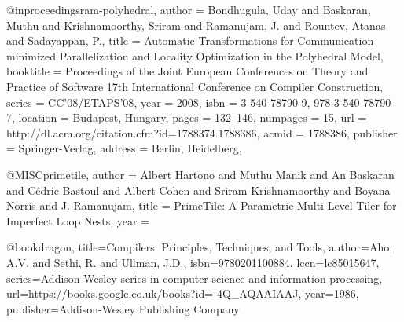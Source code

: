 @inproceedings{ram-polyhedral,
 author = {Bondhugula, Uday and Baskaran, Muthu and Krishnamoorthy, Sriram and Ramanujam, J. and Rountev, Atanas and Sadayappan, P.},
 title = {Automatic Transformations for Communication-minimized Parallelization and Locality Optimization in the Polyhedral Model},
 booktitle = {Proceedings of the Joint European Conferences on Theory and Practice of Software 17th International Conference on Compiler Construction},
 series = {CC'08/ETAPS'08},
 year = {2008},
 isbn = {3-540-78790-9, 978-3-540-78790-7},
 location = {Budapest, Hungary},
 pages = {132--146},
 numpages = {15},
 url = {http://dl.acm.org/citation.cfm?id=1788374.1788386},
 acmid = {1788386},
 publisher = {Springer-Verlag},
 address = {Berlin, Heidelberg},
} 
























@MISC{primetile,
    author = {Albert Hartono and Muthu Manik and An Baskaran and Cédric Bastoul and Albert Cohen and Sriram Krishnamoorthy and Boyana Norris and J. Ramanujam},
    title = {PrimeTile: A Parametric Multi-Level Tiler for Imperfect Loop Nests},
    year = {}
}






@book{dragon,
  title={Compilers: Principles, Techniques, and Tools},
  author={Aho, A.V. and Sethi, R. and Ullman, J.D.},
  isbn={9780201100884},
  lccn={lc85015647},
  series={Addison-Wesley series in computer science and information processing},
  url={https://books.google.co.uk/books?id=-4Q\_AQAAIAAJ},
  year={1986},
  publisher={Addison-Wesley Publishing Company}
}

